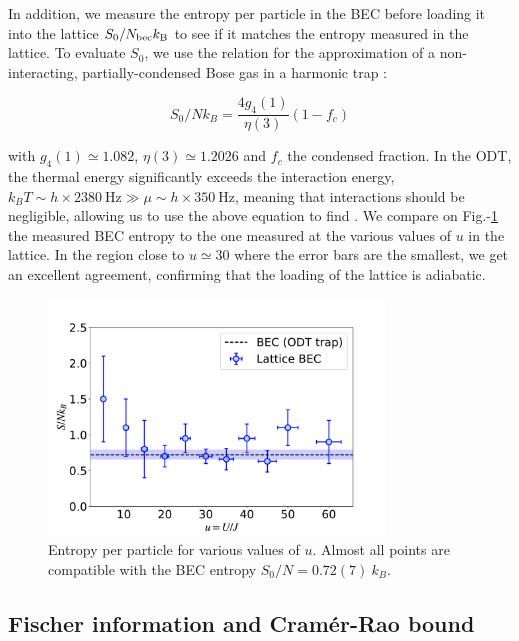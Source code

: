 In addition, we measure the entropy per particle in the BEC before loading it into the lattice $S_0/N_{\rm{bec}} k_{\mathrm{B}}$ to see if it matches the entropy measured in the lattice. To evaluate $S_0$, we use the relation for the approximation of a non-interacting, partially-condensed Bose gas in a harmonic trap \cite{pitaevskii2016bose}:

\begin{equation}
    S_{0} / N k_{B}=\frac{4 g_{4}(1)}{\eta(3)}\left(1-f_{c}\right)
\end{equation}

\noindent with $g_{4}(1) \simeq 1.082$, $\eta(3) \simeq 1.2026$ and $f_c$ the condensed fraction. In the ODT, the thermal energy significantly exceeds the interaction energy, $k_{B} T \sim h \times 2380 \mathrm{~Hz} \gg \mu \sim h \times 350 \mathrm{~Hz}$, meaning that interactions should be negligible, allowing us to use the above equation to find . We compare on Fig.-\ref{fig:entropy_BEC} the measured BEC entropy to the one measured at the various values of $u$ in the lattice. In the region close to $u \simeq 30$ where the error bars are the smallest, we get an excellent agreement, confirming that the loading of the lattice is adiabatic.

\begin{figure}
    \centering
    \includegraphics[width=0.8\textwidth]{Fig/Chapter3/entropy_BEC.pdf}
    \caption[Entropy per particle for various values of $u$]{Entropy per particle for various values of $u$. Almost all points are compatible with the BEC entropy $S_{0} / N= 0.72(7) \ k_{B}$.}
    \label{fig:entropy_BEC}
\end{figure}




\subsection{Fischer information and Cramér-Rao bound}

